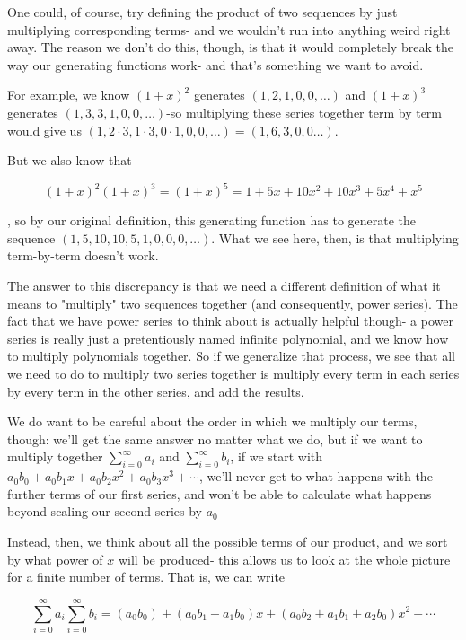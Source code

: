 \documentclass{article}
\begin{document}
One could, of course, try defining the product of two sequences by just multiplying corresponding terms- and we wouldn't run into anything weird right away. The reason we don't do this, though, is that it would completely break the way our generating functions work- and that's something we want to avoid.

For example, we know $(1+x)^{2}$ generates $(1,2,1,0,0, \ldots)$ and $(1+x)^{3}$ generates $(1,3,3,1,0,0, \ldots)$-so multiplying these series together term by term would give us $(1,2 \cdot 3,1 \cdot 3,0 \cdot 1,0,0, \ldots)=(1,6,3,0,0 \ldots)$.

But we also know that

$$
(1+x)^{2}(1+x)^{3}=(1+x)^{5}=1+5 x+10 x^{2}+10 x^{3}+5 x^{4}+x^{5}
$$

, so by our original definition, this generating function has to generate the sequence $(1,5,10,10,5,1,0,0,0, \ldots)$. What we see here, then, is that multiplying term-by-term doesn't work.

The answer to this discrepancy is that we need a different definition of what it means to "multiply" two sequences together (and consequently, power series). The fact that we have power series to think about is actually helpful though- a power series is really just a pretentiously named infinite polynomial, and we know how to multiply polynomials together. So if we generalize that process, we see that all we need to do to multiply two series together is multiply every term in each series by every term in the other series, and add the results.

We do want to be careful about the order in which we multiply our terms, though: we'll get the same answer no matter what we do, but if we want to multiply together $\sum_{i=0}^{\infty} a_{i}$ and $\sum_{i=0}^{\infty} b_{i}$, if we start with $a_{0} b_{0}+a_{0} b_{1} x+a_{0} b_{2} x^{2}+a_{0} b_{3} x^{3}+\cdots$, we'll never get to what happens with the further terms of our first series, and won't be able to calculate what happens beyond scaling our second series by $a_{0}$

Instead, then, we think about all the possible terms of our product, and we sort by what power of $x$ will be produced- this allows us to look at the whole picture for a finite number of terms. That is, we can write

$$
\sum_{i=0}^{\infty} a_{i} \sum_{i=0}^{\infty} b_{i}=\left(a_{0} b_{0}\right)+\left(a_{0} b_{1}+a_{1} b_{0}\right) x+\left(a_{0} b_{2}+a_{1} b_{1}+a_{2} b_{0}\right) x^{2}+\cdots
$$
\end{document}
